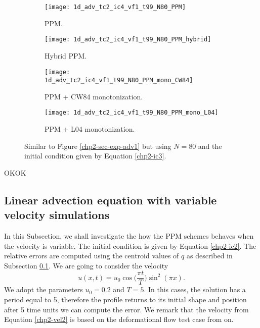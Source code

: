 \begin{figure}[!htb]
  \centering
  \begin{subfigure}{0.49\textwidth}
    \centering
			\texttt{[image: 1d\_adv\_tc2\_ic4\_vf1\_t99\_N80\_PPM]}
			\caption{PPM.\label{chp2-sec-exp-adv3-a}}
  \end{subfigure}
  \begin{subfigure}{0.49\textwidth}
    \centering
			\texttt{[image: 1d\_adv\_tc2\_ic4\_vf1\_t99\_N80\_PPM\_hybrid]}
			\caption{Hybrid PPM.\label{chp2-sec-exp-adv3-b}}
  \end{subfigure}

  \begin{subfigure}{0.49\textwidth}
    \centering
		\texttt{[image: 1d\_adv\_tc2\_ic4\_vf1\_t99\_N80\_PPM\_mono\_CW84]}
    \caption{PPM + CW84 monotonization.\label{chp2-sec-exp-adv3-c}}
  \end{subfigure}
  \begin{subfigure}{0.49\textwidth}
    \centering
			\texttt{[image: 1d\_adv\_tc2\_ic4\_vf1\_t99\_N80\_PPM\_mono\_L04]}
      \caption{PPM + L04 monotonization.\label{chp2-sec-exp-adv3-d}}
  \end{subfigure} 
	\caption{ Similar to Figure \ref{chp2-sec-exp-adv1} but using $N=80$
	and the initial condition given by Equation \eqref{chp2-ic3}.\label{chp2-sec-exp-adv3}}
\end{figure}
OKOK

\newpage

\subsection{Linear advection equation with variable velocity simulations}
\label{chp2-sec-numerical-exp-2}
In this Subsection, we shall investigate the how the PPM schemes behaves when the velocity is variable.
The initial condition is given by Equation \eqref{chp2-ic2}.
The relative errors are computed using the centroid values of $q$ as described in
Subsection \ref{chp2-sec-numerical-exp-2}. We are going to consider the velocity
\begin{equation}
	\label{chp2-vel2}
	u(x,t) = u_0\cos{\bigg(\frac{\pi t}{T}\bigg)}\sin^2(\pi x).
\end{equation}
We adopt the parameters $u_0 = 0.2$ and $T = 5$.
In this cases, the solution has a period equal to 5, therefore the profile returns to its
initial shape and position after 5 time units we can compute the error.
We remark that the velocity from Equation \eqref{chp2-vel2} is based on the deformational flow 
test case from on\citet{nair:2010}.

